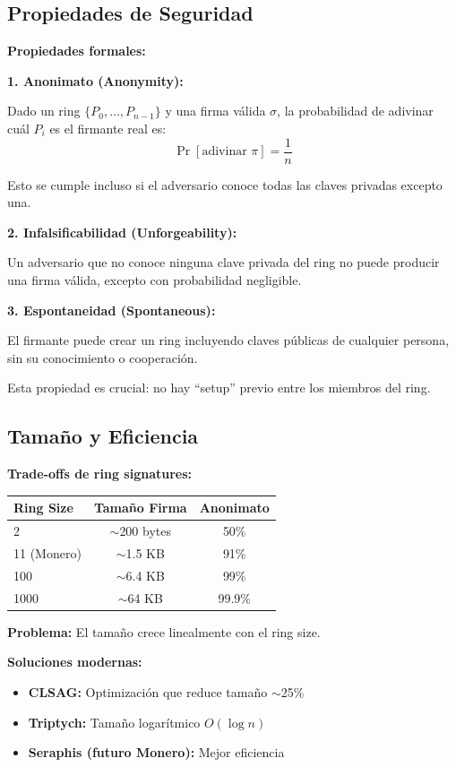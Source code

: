 \documentclass[11pt,a4paper,twoside]{book}
\begin{document}
\subsection{Propiedades de Seguridad}

\begin{keyidea}
\textbf{Propiedades formales:}

\textbf{1. Anonimato (Anonymity):}

Dado un ring $\{P_0, \ldots, P_{n-1}\}$ y una firma v\'alida $\sigma$, la probabilidad de adivinar cu\'al $P_i$ es el firmante real es:
\[ \Pr[\text{adivinar } \pi] = \frac{1}{n} \]

Esto se cumple incluso si el adversario conoce todas las claves privadas excepto una.

\textbf{2. Infalsificabilidad (Unforgeability):}

Un adversario que no conoce ninguna clave privada del ring no puede producir una firma v\'alida, excepto con probabilidad negligible.

\textbf{3. Espontaneidad (Spontaneous):}

El firmante puede crear un ring incluyendo claves p\'ublicas de cualquier persona, sin su conocimiento o cooperaci\'on.

Esta propiedad es crucial: no hay ``setup'' previo entre los miembros del ring.
\end{keyidea}

\subsection{Tama\~no y Eficiencia}

\begin{remark}
\textbf{Trade-offs de ring signatures:}

\begin{center}
\begin{tabular}{lcc}
\toprule
\textbf{Ring Size} & \textbf{Tama\~no Firma} & \textbf{Anonimato} \\
\midrule
2 & $\sim$200 bytes & 50\% \\
11 (Monero) & $\sim$1.5 KB & 91\% \\
100 & $\sim$6.4 KB & 99\% \\
1000 & $\sim$64 KB & 99.9\% \\
\bottomrule
\end{tabular}
\end{center}

\textbf{Problema:} El tama\~no crece linealmente con el ring size.

\textbf{Soluciones modernas:}
\begin{itemize}
    \item \textbf{CLSAG:} Optimizaci\'on que reduce tama\~no $\sim$25\%
    \item \textbf{Triptych:} Tama\~no logar\'itmico $O(\log n)$
    \item \textbf{Seraphis (futuro Monero):} Mejor eficiencia
\end{itemize}
\end{remark}
\end{document}

